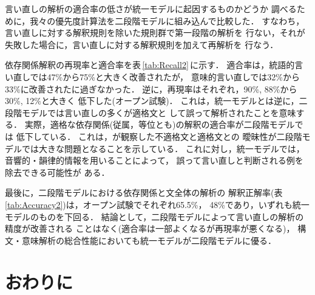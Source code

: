 言い直しの解析の適合率の低さが統一モデルに起因するものかどうか
調べるために，我々の優先度計算法を二段階モデルに組み込んで比較した．
すなわち，言い直しに対する解釈規則を除いた規則群で第一段階の解析を
行ない，それが失敗した場合に，言い直しに対する解釈規則を加えて再解析を
行なう．

依存関係解釈の再現率と適合率を表\,\ref{tab:Recall2}\,に示す．
適合率は，統語的言い直しでは47\%から75\%と大きく改善されたが，
意味的言い直しでは32\%から33\%に改善されたに過ぎなかった．
逆に，再現率はそれぞれ，90\%, 88\%から30\%, 12\%と大きく
低下した(オープン試験)．
これは，統一モデルとは逆に，二段階モデルでは言い直しの多くが適格文と
して誤って解析されたことを意味する．
実際，適格な依存関係(従属，等位とも)の解釈の適合率が二段階モデルでは
低下している．
これは，が観察した不適格文と適格文との
曖昧性が二段階モデルでは大きな問題となることを示している．
これに対し，統一モデルでは，音響的・韻律的情報を用いることによって，
誤って言い直しと判断される例を除去できる可能性が
ある\cite{O'Shaughnessy:ICSLP92-931,Nakatani:ACL93-46}．

最後に，二段階モデルにおける依存関係と文全体の解析の
解釈正解率(表\,\ref{tab:Accuracy2})は，オープン試験でそれぞれ65.5\%，
48\%であり，いずれも統一モデルのものを下回る．
結論として，二段階モデルによって言い直しの解析の精度が改善される
ことはなく(適合率は一部よくなるが再現率が悪くなる)，
構文・意味解析の総合性能においても統一モデルが二段階モデルに優る．
\section{おわりに}\label{sec:Conclude}

